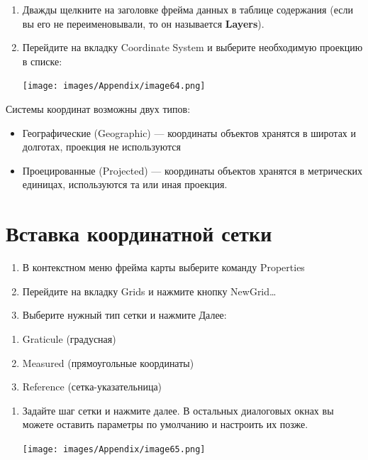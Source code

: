 \documentclass[12pt,]{book}
\begin{document}
\begin{enumerate}
\def\labelenumi{\arabic{enumi}.}
\item
  Дважды щелкните на заголовке фрейма данных в таблице содержания (если вы его не переименовывали, то он называется \textbf{Layers}).
\item
  Перейдите на вкладку Coordinate System и выберите необходимую проекцию в списке:

  \texttt{[image: images/Appendix/image64.png]}
\end{enumerate}

Системы координат возможны двух типов:

\begin{itemize}
\item
  Географические (Geographic) --- координаты объектов хранятся в широтах и долготах, проекция не используются
\item
  Проецированные (Projected) --- координаты объектов хранятся в метрических единицах, используются та или иная проекция.
\end{itemize}

\hypertarget{manual-projections-graticule}{%
\section{Вставка координатной сетки}\label{manual-projections-graticule}}

\begin{enumerate}
\def\labelenumi{\arabic{enumi}.}
\setcounter{enumi}{2}
\item
  В контекстном меню фрейма карты выберите команду Properties
\item
  Перейдите на вкладку Grids и нажмите кнопку NewGrid\ldots{}
\item
  Выберите нужный тип сетки и нажмите Далее:
\end{enumerate}

\begin{enumerate}
\def\labelenumi{\alph{enumi}.}
\item
  Graticule (градусная)
\item
  Measured (прямоугольные координаты)
\item
  Reference (сетка-указательница)
\end{enumerate}

\begin{enumerate}
\def\labelenumi{\arabic{enumi}.}
\setcounter{enumi}{5}
\item
  Задайте шаг сетки и нажмите далее. В остальных диалоговых окнах вы можете оставить параметры по умолчанию и настроить их позже.

  \texttt{[image: images/Appendix/image65.png]}
\end{enumerate}
\end{document}
